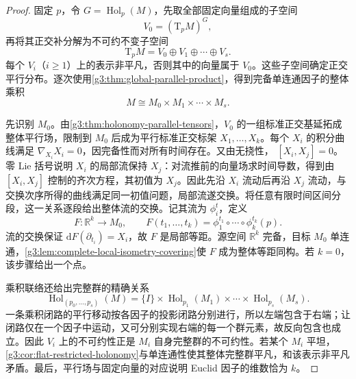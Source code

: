 \begin{proof}
	固定 \(p\)，令 \(G=\operatorname{Hol}_p(M)\)，先取全部固定向量组成的子空间
	\[
		V_0=(\mathrm{T}_pM)^G,
	\]
	再将其正交补分解为不可约不变子空间
	\[
		\mathrm{T}_pM=V_0\oplus V_1\oplus\cdots\oplus V_s.
	\]
	每个 \(V_i\)（\(i\ge1\)）上的表示非平凡，否则其中的向量属于 \(V_0\)。这些子空间确定正交平行分布。逐次使用\cref{g3:thm:global-parallel-product}，得到完备单连通因子的整体乘积
	\[
		M\cong M_0\times M_1\times\cdots\times M_s.
	\]

	先识别 \(M_0\)。由\cref{g3:thm:holonomy-parallel-tensors}，\(V_0\) 的一组标准正交基延拓成整体平行场，限制到 \(M_0\) 后成为平行标准正交标架 \(X_1,\ldots,X_k\)。每个 \(X_i\) 的积分曲线满足
	\(\nabla_{X_i}X_i=0\)，因完备性而对所有时间存在。又由无挠性，
	\([X_i,X_j]=0\)。零 Lie 括号说明 \(X_i\) 的局部流保持 \(X_j\)：对流推前的向量场求时间导数，得到由 \([X_i,X_j]\) 控制的齐次方程，其初值为 \(X_j\)。因此先沿 \(X_i\) 流动后再沿 \(X_j\) 流动，与交换次序所得的曲线满足同一初值问题，局部流遂交换。将任意有限时间区间分段，这一关系逐段给出整体流的交换。记其流为 \(\phi_i^t\)，定义
	\[
		F:\mathbb R^k\longrightarrow M_0,\qquad
		F(t_1,\ldots,t_k)=\phi_1^{t_1}\circ\cdots\circ\phi_k^{t_k}(p).
	\]
	流的交换保证 \(\mathrm dF(\partial_{t_i})=X_i\)，故 \(F\) 是局部等距。源空间 \(\mathbb R^k\) 完备，目标 \(M_0\) 单连通，\cref{g3:lem:complete-local-isometry-covering}使 \(F\) 成为整体等距同构。若 \(k=0\)，该步骤给出一个点。

	乘积联络还给出完整群的精确关系
	\begin{equation}\label{g3:eq:product-holonomy}
		\operatorname{Hol}_{(p_0,\ldots,p_s)}(M)
		=\{I\}\times
		\operatorname{Hol}_{p_1}(M_1)\times\cdots\times
		\operatorname{Hol}_{p_s}(M_s).
	\end{equation}
	一条乘积闭路的平行移动按各因子的投影闭路分别进行，所以左端包含于右端；让闭路仅在一个因子中运动，又可分别实现右端的每一个群元素，故反向包含也成立。因此 \(V_i\) 上的不可约性正是 \(M_i\) 自身完整群的不可约性。若某个 \(M_i\) 平坦，\cref{g3:cor:flat-restricted-holonomy}与单连通性使其整体完整群平凡，和该表示非平凡矛盾。最后，平行场与固定向量的对应说明 Euclid 因子的维数恰为 \(k\)。
\end{proof}


